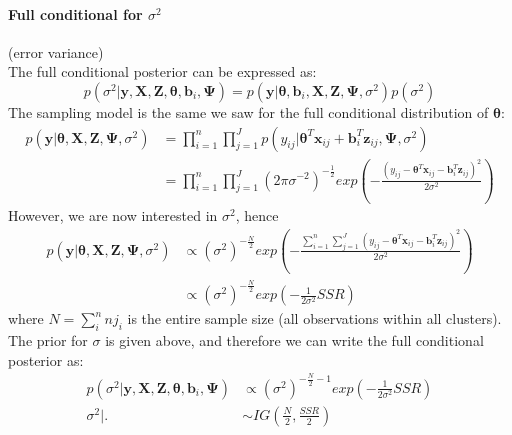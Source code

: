 \documentclass[a4paper]{article}
\begin{document}
\paragraph{Full conditional for $\sigma^2$}(error variance)\\

The full conditional posterior can be expressed as:
 \begin{equation*}
	p(\sigma^2|\bm{y}, \bm{X}, \bm{Z}, \bm{\theta}, \bm{b}_{i}, \bm{\Psi}) = 	p(\bm{y}|\bm{\theta}, \bm{b}_{i}, \bm{X}, \bm{Z}, \bm{\Psi}, \sigma^2) p(\sigma^2)
 \end{equation*}
The sampling model is the same we saw for the full conditional distribution of $\bm{\theta}$:
 \begin{equation*}
  \begin{split}
	p(\bm{y}|\bm{\theta}, \bm{X}, \bm{Z}, \bm{\Psi}, \sigma^2)& = \prod_{i=1}^n \prod_{j=1}^Jp(y_{ij}|\bm{\theta}^{T}\bm{x}_{ij} + \bm{b}_{i}^{T}\bm{z}_{ij}, \bm{\Psi}, \sigma^2)\\
	&= \prod_{i=1}^{n} \prod_{j=1}^{J}(2\pi\sigma^{-2})^{-\frac{1}{2}}exp(-\frac{(y_{ij} - \bm{\theta}^{T}\bm{x}_{ij} - \bm{b}_{i}^{T}\bm{z}_{ij})^2}{2\sigma^2})	
  \end{split}
 \end{equation*}
However, we are now interested in $\sigma^2$, hence
 \begin{equation*}
  \begin{split}
	p(\bm{y}|\bm{\theta},\bm{X},\bm{Z},\bm{\Psi},\sigma^2)& \propto (\sigma^{2})^{-\frac{N}{2}}exp(-\frac{\sum_{i = 1}^{n}\sum_{j = 1}^{J}( y_{ij}-\bm{\theta}^{T}\bm{x}_{ij} - \bm{b}_{i}^{T}\bm{z}_{ij})^2 }{2\sigma^2}) \\
	&\propto (\sigma^{2})^{-\frac{N}{2}}exp(-\frac{1}{2\sigma^2}SSR)
  \end{split}
 \end{equation*}
where $N = \sum_{i}^{n}nj_{i}$ is the entire sample size (all observations within all clusters).
The prior for $\sigma$ is given above, and therefore we can write the full conditional posterior as:
 \begin{equation}
  \begin{split}
	p(\sigma^2|\bm{y},\bm{X},\bm{Z},\bm{\theta},\bm{b}_{i},\bm{\Psi})& \propto (\sigma^{2})^{-\frac{N}{2}-1}exp(-\frac{1}{2\sigma^2}SSR)\\
	\sigma^2|.& \sim IG(\frac{N}{2}, \frac{SSR}{2})
  \end{split}
 \end{equation}
\end{document}
